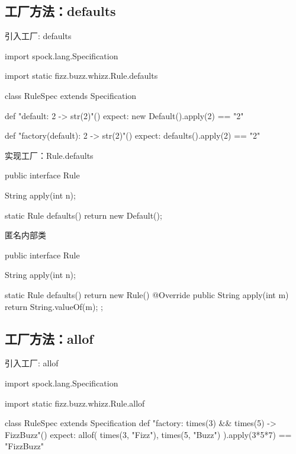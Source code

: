 \subsection{工厂方法：defaults}

\begin{frame}[fragile]{引入工厂: defaults}
  \begin{scala}
import spock.lang.Specification

import static fizz.buzz.whizz.Rule.defaults

class RuleSpec extends Specification {
  def "default: 2 -> str(2)"() {
    expect:
    new Default().apply(2) == "2"
  }

  def "factory(default): 2 -> str(2)"() {
    expect:
    defaults().apply(2) == "2"
  }
}
  \end{scala}
\end{frame}

\begin{frame}[fragile]{实现工厂：Rule.defaults}
  \begin{java}
public interface Rule {
  String apply(int n);

  static Rule defaults() {
    return new Default();
  }
}
  \end{java}
\end{frame}

\begin{frame}[fragile]{匿名内部类}
  \begin{java}
public interface Rule {
  String apply(int n);
  
  static Rule defaults() {
    return new Rule() {
      @Override
      public String apply(int m) {
        return String.valueOf(m);
      }
    };
  }
}
  \end{java}
\end{frame}

\subsection{工厂方法：allof}

\begin{frame}[fragile]{引入工厂: allof}
  \begin{scala}
import spock.lang.Specification

import static fizz.buzz.whizz.Rule.allof

class RuleSpec extends Specification {
  def "factory: times(3) && times(5) -> FizzBuzz"() {
    expect:
    allof(
        times(3, "Fizz"),
        times(5, "Buzz")
    ).apply(3*5*7) == "FizzBuzz"
  }
}
  \end{scala}
\end{frame}


